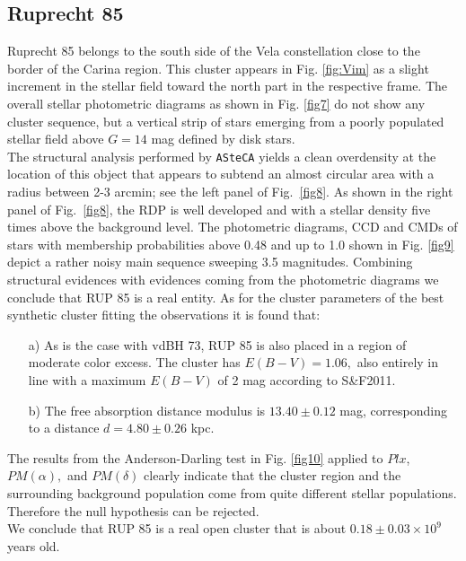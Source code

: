 \documentclass[draft]{aa}
\begin{document}
\subsection{Ruprecht 85}

Ruprecht 85 belongs to the south side of the Vela constellation close to the
border of the Carina region. This cluster appears in Fig. \ref{fig:Vim} as a
slight increment in the stellar field toward the north part in the respective
frame.
The overall stellar photometric diagrams as shown in Fig. \ref{fig7} do not show any cluster sequence, but a vertical strip of stars emerging from
a poorly populated stellar field above $G=14$ mag defined by disk stars.\\

The structural analysis performed by \texttt{ASteCA} yields a clean overdensity
at the location of this object that appears to subtend an almost circular area
with a radius between 2-3 arcmin; see the left panel of Fig.~\ref{fig8}.
As shown in the right panel of Fig.~\ref{fig8}, the RDP is well developed
and with a stellar density five times above the background level. The
photometric diagrams, CCD and CMDs of stars with membership probabilities above
0.48 and up to 1.0 shown in Fig. \ref{fig9} depict a rather noisy main
sequence sweeping 3.5 magnitudes.
Combining structural evidences with evidences coming from the photometric
diagrams we conclude that RUP 85 is a real entity. As for the cluster
parameters of the best synthetic cluster fitting the observations it is found
that:

\begin{itemize}
\item [a)] As is the case with vdBH 73, RUP 85 is also placed
in a region of moderate color excess. The cluster has $E(B-V)=1.06,$
also entirely in line with a maximum $E(B-V)$ of 2 mag according to S\&F2011.
\item [b)] The free absorption distance modulus is $13.40\pm0.12$ mag,
corresponding to a distance $d=4.80\pm0.26$ kpc.
\end{itemize}

The results from the Anderson-Darling test in Fig. \ref{fig10} applied to $Plx$,
$PM(\alpha),$ and $PM(\delta)$ clearly indicate that the cluster region and the
surrounding background population come from quite different stellar populations.
Therefore the null hypothesis can be rejected.\\

We conclude that RUP 85 is a real open cluster that is about $0.18\pm0.03\times10^9$
years old.
\end{document}
